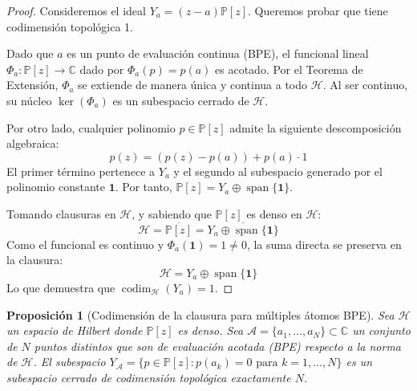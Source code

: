 \documentclass[12pt,a4paper]{article}
\newtheorem{proposition}{Proposición}
\theoremstyle{definition}
\theoremstyle{remark}
\newcommand{\Poly}{\mathbb{P}[z]}
\begin{document}
\begin{proof}
  Consideremos el ideal $Y_a = (z-a)\Poly$. Queremos probar que tiene codimensión topológica 1.

  Dado que $a$ es un punto de evaluación continua (BPE), el funcional lineal $\Phi_a: \Poly \to \mathbb{C}$ dado por $\Phi_a(p) = p(a)$ es acotado. Por el Teorema de Extensión, $\Phi_a$ se extiende de manera única y continua a todo $\mathcal{H}$. Al ser continuo, su núcleo $\ker(\Phi_a)$ es un subespacio cerrado de $\mathcal{H}$.

  Por otro lado, cualquier polinomio $p \in \Poly$ admite la siguiente descomposición algebraica:
  $$p(z) = (p(z) - p(a)) + p(a) \cdot 1$$
  El primer término pertenece a $Y_a$ y el segundo al subespacio generado por el polinomio constante $\mathbf{1}$. Por tanto, $\Poly = Y_a \oplus \operatorname{span}\{\mathbf{1}\}$.

  Tomando clausuras en $\mathcal{H}$, y sabiendo que $\Poly$ es denso en $\mathcal{H}$:
  $$\mathcal{H} = \overline{\Poly} = \overline{Y_a \oplus \operatorname{span}\{\mathbf{1}\}}$$
  Como el funcional es continuo y $\Phi_a(\mathbf{1}) = 1 \neq 0$, la suma directa se preserva en la clausura:
  $$\mathcal{H} = Y_a \oplus \operatorname{span}\{\mathbf{1}\}$$
  Lo que demuestra que $\operatorname{codim}_{\mathcal{H}}(Y_a) = 1$.
\end{proof}

\begin{proposition}[Codimensión de la clausura para múltiples átomos BPE]
  Sea $\mathcal{H}$ un espacio de Hilbert donde $\Poly$ es denso. Sea $\mathcal{A} = \{a_1, \dots, a_N\} \subset \mathbb{C}$ un conjunto de $N$ puntos distintos que son de evaluación acotada (BPE) respecto a la norma de $\mathcal{H}$. El subespacio $Y_{\mathcal{A}} = \{p \in \Poly : p(a_k) = 0 \text{ para } k=1,\dots,N\}$ es un subespacio cerrado de codimensión topológica exactamente $N$.
\end{proposition}
\end{document}
